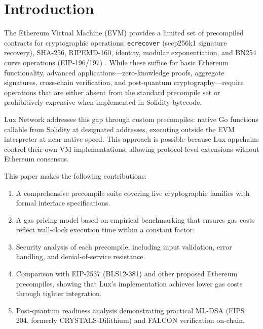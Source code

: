 \section{Introduction}


The Ethereum Virtual Machine (EVM) provides a limited set of precompiled contracts for cryptographic operations: \texttt{ecrecover} (secp256k1 signature recovery), SHA-256, RIPEMD-160, identity, modular exponentiation, and BN254 curve operations (EIP-196/197) \cite{buterin2014ethereum, eip196, eip197}. While these suffice for basic Ethereum functionality, advanced applications---zero-knowledge proofs, aggregate signatures, cross-chain verification, and post-quantum cryptography---require operations that are either absent from the standard precompile set or prohibitively expensive when implemented in Solidity bytecode.

Lux Network addresses this gap through custom precompiles: native Go functions callable from Solidity at designated addresses, executing outside the EVM interpreter at near-native speed. This approach is possible because Lux appchains control their own VM implementations, allowing protocol-level extensions without Ethereum consensus.

This paper makes the following contributions:

\begin{enumerate}[label=(\roman*)]
    \item A comprehensive precompile suite covering five cryptographic families with formal interface specifications.
    \item A gas pricing model based on empirical benchmarking that ensures gas costs reflect wall-clock execution time within a constant factor.
    \item Security analysis of each precompile, including input validation, error handling, and denial-of-service resistance.
    \item Comparison with EIP-2537 (BLS12-381) and other proposed Ethereum precompiles, showing that Lux's implementation achieves lower gas costs through tighter integration.
    \item Post-quantum readiness analysis demonstrating practical ML-DSA (FIPS 204, formerly CRYSTALS-Dilithium) and FALCON verification on-chain.
\end{enumerate}

